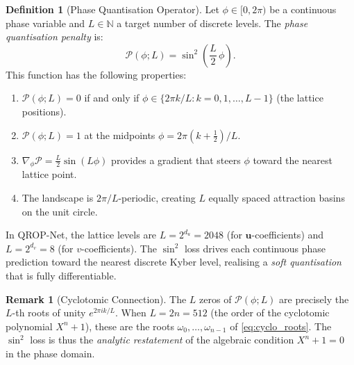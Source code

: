 \documentclass[11pt, a4paper]{article}
\theoremstyle{definition}
\newtheorem{definition}{Definition}[section]
\newtheorem{remark}{Remark}[section]
\theoremstyle{plain}
\begin{document}
\begin{definition}[Phase Quantisation Operator]
\label{def:pqo}
Let $\phi \in [0, 2\pi)$ be a continuous phase variable and $L \in
\mathbb{N}$ a target number of discrete levels. The \textit{phase
quantisation penalty} is:
\begin{equation}
  \mathcal{P}(\phi; L) = \sin^2\!\left(\frac{L}{2}\,\phi\right).
  \label{eq:pqo}
\end{equation}
This function has the following properties:
\begin{enumerate}
  \item $\mathcal{P}(\phi; L) = 0$ if and only if
        $\phi \in \{2\pi k/L : k = 0, 1, \ldots, L-1\}$
        (the lattice positions).
  \item $\mathcal{P}(\phi; L) = 1$ at the midpoints
        $\phi = 2\pi(k + \tfrac{1}{2})/L$.
  \item $\nabla_\phi \mathcal{P} =
        \tfrac{L}{2}\sin(L\phi)$ provides a gradient that steers $\phi$
        toward the nearest lattice point.
  \item The landscape is $2\pi/L$-periodic, creating $L$ equally spaced
        attraction basins on the unit circle.
\end{enumerate}
\end{definition}

In QROP-Net, the lattice levels are $L = 2^{d_u} = 2048$ (for
$\mathbf{u}$-coefficients) and $L = 2^{d_v} = 8$ (for
$v$-coefficients). The $\sin^2$ loss drives each continuous phase
prediction toward the nearest discrete Kyber level, realising a
\textit{soft quantisation} that is fully differentiable.

\begin{remark}[Cyclotomic Connection]
\label{rem:cyclotomic}
The $L$ zeros of $\mathcal{P}(\phi; L)$ are precisely the $L$-th roots
of unity $e^{2\pi i k/L}$. When $L = 2n = 512$ (the order of the
cyclotomic polynomial $X^n + 1$), these are the roots
$\omega_0, \ldots, \omega_{n-1}$ of \cref{eq:cyclo_roots}. The
$\sin^2$ loss is thus the \textit{analytic restatement} of the algebraic
condition $X^n + 1 = 0$ in the phase domain.
\end{remark}
\end{document}
